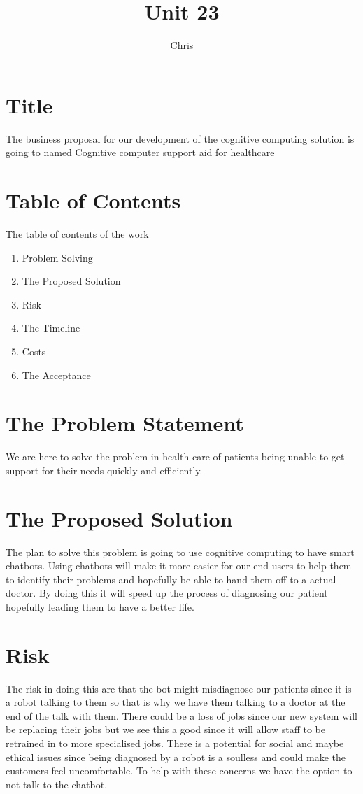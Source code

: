 \documentclass{article}
\title{Unit 23}
\author{Chris}
\date{}
\begin{document}
\section{Title}
The business proposal for our development of the cognitive computing solution is going to named 
Cognitive computer support aid for healthcare

\section{Table of Contents}
The table of contents of the work
\begin{enumerate}
	\item	Problem Solving
	\item	The Proposed Solution
	\item 	Risk
	\item The Timeline
	\item Costs
	\item The Acceptance
\end{enumerate}

\section{The Problem Statement}
We are here to solve the problem in health care of patients being unable to get support for their needs quickly and efficiently.

\section{The Proposed Solution}
The plan to solve this problem is going to use cognitive computing to have smart chatbots. Using chatbots will make it more easier for our end users to help them to identify their problems and hopefully be able to hand them off to a actual doctor. By doing this it will speed up the process of diagnosing our patient hopefully leading them to have a better life.

\section{Risk}
The risk in doing this are that the bot might misdiagnose our patients since it is a robot talking to them so that is why we have them talking to a doctor at the end of the talk with them. There could be a loss of jobs since our new system will be replacing their jobs but we see this a good since it will allow staff to be retrained in to more specialised jobs. 
There is a potential for social and maybe ethical issues since being diagnosed by a robot is a soulless and could make the customers feel uncomfortable. To help with these concerns we have the option to not talk to the chatbot.
\end{document}
